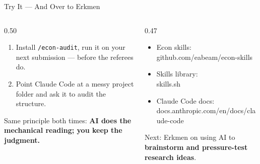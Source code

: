 \documentclass[aspectratio=169, 10pt]{beamer}
\begin{document}
\begin{frame}[fragile]{Try It --- And Over to Erkmen}
\begin{columns}[T]
\begin{column}{0.50\textwidth}
\begin{tcolorbox}[keybox, title={\faRocket\quad What to Try First}]
\small
\begin{enumerate}\setlength{\itemsep}{3pt}
  \item Install \texttt{/econ-audit}, run it on your next submission --- before the referees do.
  \item Point Claude Code at a messy project folder and ask it to audit the structure.
\end{enumerate}
\end{tcolorbox}
\vskip4pt
\begin{tcolorbox}[quotebox, top=3pt, bottom=3pt]
\scriptsize Same principle both times: \textbf{AI does the mechanical reading; you keep the judgment.}
\end{tcolorbox}
\end{column}
\begin{column}{0.47\textwidth}
\begin{tcolorbox}[keybox, title={\faLink\quad Resources}, top=3pt, bottom=3pt]
\small
\begin{itemize}\setlength{\itemsep}{3pt}
  \item Econ skills:\\{\scriptsize\ttfamily github.com/eabeam/econ-skills}
  \item Skills library:\\{\scriptsize\ttfamily skills.sh}
  \item Claude Code docs:\\{\scriptsize\ttfamily docs.anthropic.com/en/docs/claude-code}
\end{itemize}
\end{tcolorbox}
\vskip4pt
{\small\color{SlateTeal} Next: Erkmen on using AI to \textbf{brainstorm and pressure-test research ideas}.}
\end{column}
\end{columns}
\end{frame}
\end{document}
